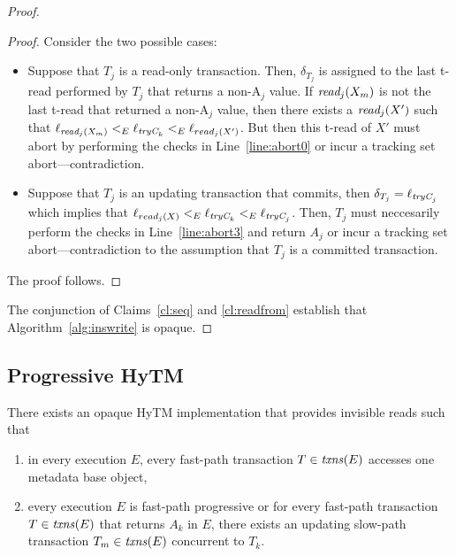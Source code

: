 \begin{proof}
\begin{proof}
Consider the two possible cases:
%
\begin{itemize}
\item
Suppose that $T_j$ is a read-only transaction. 
Then, $\delta_{T_j}$ is assigned to the last t-read performed by $T_j$ that returns a non-A$_j$ value. 
If $\textit{read}_j(X_m)$ is not the last t-read that returned a non-A$_j$ value, then there exists a $\textit{read}_j(X')$ such that 
$\ell_{\textit{read}_j(X_m)} <_{E} \ell_{\textit{tryC}_k} <_E \ell_{read_j(X')}$.
But then this t-read of $X'$ must abort by performing the checks in Line~\ref{line:abort0} or incur a tracking set abort---contradiction.
\item
Suppose that $T_j$ is an updating transaction that commits, then $\delta_{T_j}=\ell_{\textit{tryC}_j}$ which implies that
$\ell_{read_j(X)} <_{E} \ell_{\textit{tryC}_k} <_E \ell_{\textit{tryC}_j}$. Then, $T_j$ must neccesarily perform the checks
in Line~\ref{line:abort3} and return $A_j$ or incur a tracking set abort---contradiction to the assumption that $T_j$ is a committed transaction.
\end{itemize}
%
The proof follows.
%
\end{proof}
%
The conjunction of Claims~\ref{cl:seq} and \ref{cl:readfrom} establish that Algorithm~\ref{alg:inswrite} is opaque.
%
\end{proof}
%


\subsection{Progressive HyTM}
%
\begin{theorem}
\label{th:inswrite2}
There exists an opaque HyTM implementation that provides invisible reads
such that 
\begin{enumerate}
 \item 
in every execution $E$,
every fast-path transaction $T\in \ms{txns}(E)$
accesses one metadata base object,
\item
every execution $E$ is fast-path progressive or for
every fast-path transaction $T\in \ms{txns}(E)$
that returns $A_k$ in $E$, there exists an updating slow-path transaction $T_m \in \ms{txns}(E)$
concurrent to $T_k$.
\end{enumerate}
\end{theorem}



%